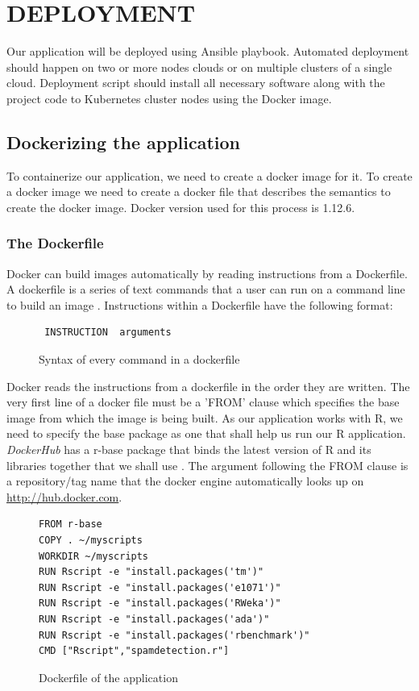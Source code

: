 \documentclass[9pt,twocolumn,twoside]{../../styles/osajnl}
\begin{document}
\section{DEPLOYMENT}
Our application will be deployed using Ansible \cite{www-ansible}
playbook. Automated deployment should happen on two or more nodes
clouds or on multiple clusters of a single cloud. Deployment script
should install all necessary software along with the project code to
Kubernetes cluster nodes using the Docker image.

\subsection{Dockerizing the application}
To containerize our application, we need to create a docker image for
it. To create a docker image we need to create a docker file that
describes the semantics to create the docker image. Docker version
used for this process is 1.12.6.

\subsubsection{The Dockerfile}
Docker can build images automatically by reading instructions from a
Dockerfile. A dockerfile is a series of text commands that a user can
run on a command line to build an image \cite{www-dockerfile-documentation}.
\newline
Instructions within a Dockerfile have the following format:
\begin{figure}[H]
\begin{verbatim}
 INSTRUCTION  arguments
\end{verbatim}
\caption{Syntax of every command in a dockerfile}
\label{Syntax of every command in a dockerfile}
\end{figure}

Docker reads the instructions from a dockerfile in the order they are
written. The very first line of a docker file must be a 'FROM' clause
which specifies the base image from which the image is being built. As
our application works with R, we need to specify the base package as
one that shall help us run our R application. \emph{DockerHub} has a
r-base package that binds the latest version of R and its libraries
together that we shall use \cite{www-rbase-docker}.  The argument
following the FROM clause is a repository/tag name that the docker
engine automatically looks up on \url{http://hub.docker.com}.

\begin{figure}[h]
\begin{verbatim}
FROM r-base
COPY . ~/myscripts
WORKDIR ~/myscripts
RUN Rscript -e "install.packages('tm')"
RUN Rscript -e "install.packages('e1071')"
RUN Rscript -e "install.packages('RWeka')"
RUN Rscript -e "install.packages('ada')"
RUN Rscript -e "install.packages('rbenchmark')"
CMD ["Rscript","spamdetection.r"]
\end{verbatim}
\caption{Dockerfile of the application}
\label{Dockerfile of the application}
\end{figure}
\end{document}
